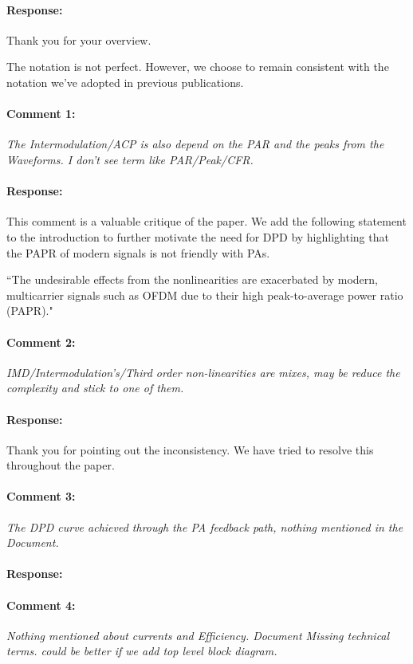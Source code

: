 \documentclass[]{article}
\begin{document}
\paragraph{Response:}
Thank you for your overview.

The notation is not perfect. However, we choose to remain consistent with the notation we've adopted in previous publications. 


\paragraph{Comment 1:}\textit{The Intermodulation/ACP is also depend on the PAR and the peaks from the Waveforms. I don't see term like PAR/Peak/CFR.}

\paragraph{Response:}
This comment is a valuable critique of the paper. We add the following statement to the introduction to further motivate the need for DPD by highlighting that the PAPR of modern signals is not friendly with PAs. 
 
{\color{red}``The undesirable effects from the nonlinearities are exacerbated by modern, multicarrier signals such as OFDM due to their high peak-to-average power ratio (PAPR)."}

\paragraph{Comment 2:}\textit{IMD/Intermodulation's/Third order non-linearities are mixes, may be reduce the complexity and stick to one of them.}
\paragraph{Response:}
Thank you for pointing out the inconsistency. We have tried to resolve this throughout the paper. 
	
\paragraph{Comment 3:}\textit{The DPD curve achieved through the PA feedback path, nothing mentioned in the Document.}
\paragraph{Response:}
	
\paragraph{Comment 4:}\textit{Nothing mentioned about currents and Efficiency. Document Missing technical terms. could be better if we add top level block diagram.
}
\end{document}
